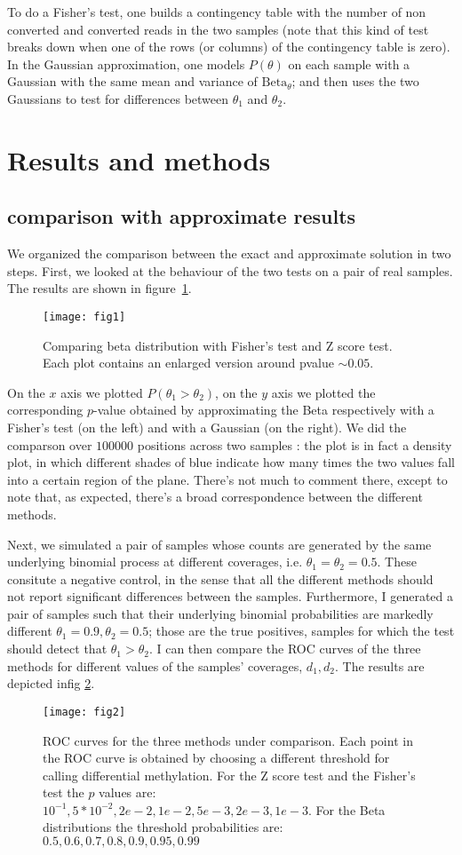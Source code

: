\documentclass[11pt]{amsart}
\newcommand{\betapdf}{\mbox{Beta}_\theta}
\begin{document}
To do a Fisher's test, one builds a contingency table with the number of non converted and converted reads in the two samples (note that this kind of test breaks down when one of the rows (or columns) of the contingency table is zero). In the Gaussian approximation, one models $P(\theta)$ on each sample with a Gaussian with the same mean and variance of $\betapdf$; and then uses the two Gaussians to test for differences between $\theta_1$ and $\theta_2$. 
\section{Results and methods} 
\subsection{comparison with approximate results}
We organized the comparison between the exact and approximate solution in two steps. First,
we looked at the behaviour of the two tests on a pair of real samples. The results are shown in figure~\ref{cmpreal}.
\begin{figure}[h]
\caption{Comparing beta distribution with Fisher's test and Z score test. Each plot contains an enlarged version around pvalue $\sim 0.05$.}
\texttt{[image: fig1]}
\label{cmpreal}
\end{figure}
On the $x$ axis we plotted $P(\theta_1>\theta_2)$, on the $y$ axis we plotted the corresponding $p$-value obtained by approximating the Beta respectively with a Fisher's test (on the left) and with a Gaussian (on the right).
We did the comparson over $100000$ positions across two samples : the plot is in fact a density plot, in which different shades of blue indicate how many times the two values fall into a certain region of the plane. There's not much to comment there, except to note that, as expected, there's a broad correspondence between the different methods.

Next, we simulated a pair of samples whose counts are generated by the same underlying binomial process at different coverages, i.e. $\theta_1=\theta_2=0.5$. These consitute a negative control, in the sense that all the different methods should not report significant differences between the samples. Furthermore, I generated a pair of samples such that their underlying binomial probabilities are markedly different $\theta_1=0.9,\theta_2=0.5$; those are the true positives, samples for which the test should detect that $\theta_1>\theta_2$. I can then compare the ROC curves of the three methods for different values of the samples' coverages, $d_1,d_2$. 
The results are depicted infig \ref{roc}.
\begin{figure}[h]
\caption{ROC curves for the three methods under comparison. Each point in the ROC curve is obtained by choosing a different threshold for calling differential methylation. For the Z score test and the Fisher's test the $p$ values are:$10^{-1},5*10^{-2},2e-2,1e-2,5e-3,2e-3,1e-3$. For the Beta distributions the threshold probabilities are:$0.5,0.6,0.7,0.8,0.9,0.95,0.99$ }
\texttt{[image: fig2]}
\label{roc}
\end{figure}
\end{document}
